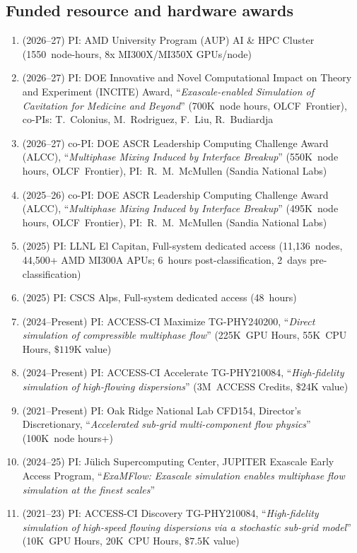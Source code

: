 \subsection{Funded resource and hardware awards}

\begin{enumerate}
    \item (2026--27) PI: AMD University Program (AUP) AI \& HPC Cluster (1550~node-hours, 8x MI300X/MI350X GPUs/node)
    \item (2026--27) PI: DOE Innovative and Novel Computational Impact on Theory and Experiment (INCITE) Award, ``\textit{Exascale-enabled Simulation of Cavitation for Medicine and Beyond}'' (700K~node hours, OLCF~Frontier), co-PIs: T.~Colonius, M.~Rodriguez, F.~Liu, R.~Budiardja
    \item (2026--27) co-PI: DOE ASCR Leadership Computing Challenge Award (ALCC), ``\textit{Multiphase Mixing Induced by Interface Breakup}'' (550K~node hours, OLCF~Frontier), PI:~R.~M.~McMullen (Sandia National Labs)
    \item (2025--26) co-PI: DOE ASCR Leadership Computing Challenge Award (ALCC), ``\textit{Multiphase Mixing Induced by Interface Breakup}'' (495K~node hours, OLCF~Frontier), PI:~R.~M.~McMullen (Sandia National Labs)
    \item (2025) PI: LLNL El Capitan, Full-system dedicated access (11,136~nodes, 44,500+ AMD MI300A APUs; 6~hours post-classification, 2~days pre-classification)
    \item (2025) PI: CSCS Alps, Full-system dedicated access (48~hours)
    \item (2024--Present) PI: ACCESS-CI Maximize TG-PHY240200, ``\textit{Direct simulation of compressible multiphase flow}'' (225K~GPU Hours, 55K~CPU Hours, $\$119$K value)
    \item (2024--Present) PI: ACCESS-CI Accelerate TG-PHY210084, ``\textit{High-fidelity simulation of high-flowing dispersions}'' (3M~ACCESS Credits, $\$24$K value)
    \item (2021--Present) PI: Oak Ridge National Lab CFD154, Director's Discretionary, ``\textit{Accelerated sub-grid multi-component flow physics}'' (100K~node hours+)
    \item (2024--25) PI: J\"ulich Supercomputing Center, JUPITER Exascale Early Access Program, ``\textit{ExaMFlow: Exascale simulation enables multiphase flow simulation at the finest scales}''
    \item (2021--23) PI: ACCESS-CI Discovery TG-PHY210084, ``\textit{High-fidelity simulation of high-speed flowing dispersions via a stochastic sub-grid model}'' (10K~GPU Hours, 20K~CPU Hours, $\$7.5$K value)

\end{enumerate}
